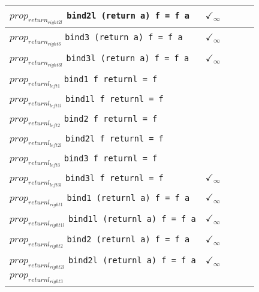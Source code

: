 \documentclass{article}
\begin{document}
\begin{longtable}{p{10cm} || c | c | c | c | }
\hline
$prop_{return_{right2l}}$ \newline \verb`bind2l (return a) f = f a` & $\checkmark_{\infty}$ &  &  &  \\
\hline
$prop_{return_{right3}}$ \newline \verb`bind3 (return a) f = f a` & $\checkmark_{\infty}$ &  &  &  \\
\hline
$prop_{return_{right3l}}$ \newline \verb`bind3l (return a) f = f a` & $\checkmark_{\infty}$ &  &  &  \\
\hline
$prop_{returnl_{left1}}$ \newline \verb`bind1 f returnl = f` &  &  &  &  \\
\hline
$prop_{returnl_{left1l}}$ \newline \verb`bind1l f returnl = f` &  &  &  &  \\
\hline
$prop_{returnl_{left2}}$ \newline \verb`bind2 f returnl = f` &  &  &  &  \\
\hline
$prop_{returnl_{left2l}}$ \newline \verb`bind2l f returnl = f` &  &  &  &  \\
\hline
$prop_{returnl_{left3}}$ \newline \verb`bind3 f returnl = f` &  &  &  &  \\
\hline
$prop_{returnl_{left3l}}$ \newline \verb`bind3l f returnl = f` & $\checkmark_{\infty}$ &  &  &  \\
\hline
$prop_{returnl_{right1}}$ \newline \verb`bind1 (returnl a) f = f a` & $\checkmark_{\infty}$ &  &  &  \\
\hline
$prop_{returnl_{right1l}}$ \newline \verb`bind1l (returnl a) f = f a` & $\checkmark_{\infty}$ &  &  &  \\
\hline
$prop_{returnl_{right2}}$ \newline \verb`bind2 (returnl a) f = f a` & $\checkmark_{\infty}$ &  &  &  \\
\hline
$prop_{returnl_{right2l}}$
\newline \verb`bind2l (returnl a) f = f a` & $\checkmark_{\infty}$ &  &  &  \\
\hline
$prop_{returnl_{right3}}$

\end{longtable}
\end{document}
